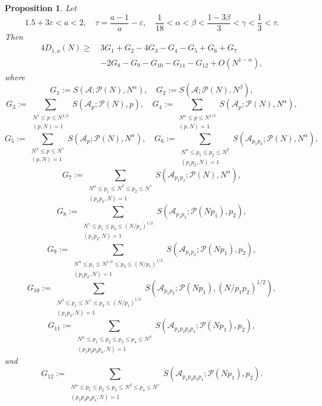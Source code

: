 \documentclass[12pt, a4paper]{amsart}
\def\leq{\leqslant}
\def\geq{\geqslant}
\def\le{\leqslant}
\theoremstyle{plain}
\newtheorem{proposition}{Proposition}[section]
\theoremstyle{remark}
\numberwithin{equation}{section}
\begin{document}
\begin{proposition}\label{Goldbachweight1}
Let 
$$
1.5+3\varepsilon<a<2,\quad \tau=\dfrac{a-1}{a}-\varepsilon, \quad \dfrac{1}{18}<\alpha<\beta<\dfrac{1-3\beta}{3}<\gamma< \dfrac{1}{3}<\tau. 
$$ 
Then 
\begin{equation}\label{Goldbachbigw4}
\begin{split}
4D_{1,a}(N) \geq\ & 3G_1 + G_2 -4G_3- G_4- G_5 + G_6 + G_7 \\
&- 2G_8 - G_9 - G_{10} - G_{11} - G_{12} + O(N^{1 - \alpha}),
\end{split}
\end{equation}
where
\[
G_1 := S(\mathscr{A}; \mathscr{P}(N), N^{\alpha}),
\quad 
G_2 := S(\mathscr{A}; \mathscr{P}(N), N^{\beta}),
\]
\[
G_3 :=\sum\limits_{\substack{N^\tau\le p\le N^{1/2} \\(p, N)=1}}S(\mathscr{A}_p ; \mathscr{P}(N), p), 
\quad 
G_4 := \sum_{\substack{N^{\alpha} \leq p \le N^{1/3} \\ (p, N) = 1}} S(\mathscr{A}_p; \mathscr{P}(N), N^{\alpha}), 
\]
\[
G_5 := \sum_{\substack{N^{\alpha} \leq p \le N^{\gamma} \\ (p, N) = 1}} S(\mathscr{A}_p; \mathscr{P}(N), N^{\alpha}),
\quad 
G_6 := \sum_{\substack{N^{\alpha} \leq p_1 \le p_2 \le N^{\beta} \\ (p_1 p_2, N) = 1}} S(\mathscr{A}_{p_1 p_2}; \mathscr{P}(N), N^{\alpha}),
\]
\[
G_7 := \sum_{\substack{N^{\alpha} \leq p_1 \le N^{\beta} \le p_2 \le N^{\gamma} \\ (p_1 p_2, N) = 1}} S(\mathscr{A}_{p_1 p_2}; \mathscr{P}(N), N^{\alpha}),
\]
\[ 
G_8 := \sum_{\substack{N^{\gamma} \leq p_1 \le p_2 \le (N/p_1)^{1/2} \\ (p_1 p_2, N) = 1}} S(\mathscr{A}_{p_1 p_2}; \mathscr{P}(N p_1), p_2),
\]
\[
G_9 := \sum_{\substack{N^{\alpha} \leq p_1 \le N^{1/3} \leq p_2 \le (N/p_1)^{1/2} \\ (p_1 p_2, N) = 1}} S(\mathscr{A}_{p_1 p_2}; \mathscr{P}(N p_1), p_2),
\]
\[
G_{10} := \sum_{\substack{N^{\beta} \leq p_1 \le N^{\gamma} \leq p_2 \le (N/p_1)^{1/2} \\ (p_1 p_2, N) = 1}} S(\mathscr{A}_{p_1 p_2}; \mathscr{P}(N p_1), (N/p_1 p_2)^{1/2}), 
\]
\[
G_{11} := \sum_{\substack{N^{\alpha} \leq p_1 \le p_2 \le p_3 \le p_4 \le N^{\beta} \\ (p_1 p_2 p_3 p_4, N) = 1}} S(\mathscr{A}_{p_1 p_2 p_3 p_4}; \mathscr{P}(Np_1), p_2),
\]
and 
\[
G_{12} := \sum_{\substack{N^{\alpha} \leq p_1 \le p_2 \le p_3 \le N^{\beta} \leq p_4 \le N^{\gamma}\\ (p_1 p_2 p_3 p_4, N) = 1}} S(\mathscr{A}_{p_1 p_2 p_3 p_4}; \mathscr{P}(Np_1), p_2).
\]
\end{proposition}
	
\end{document}
